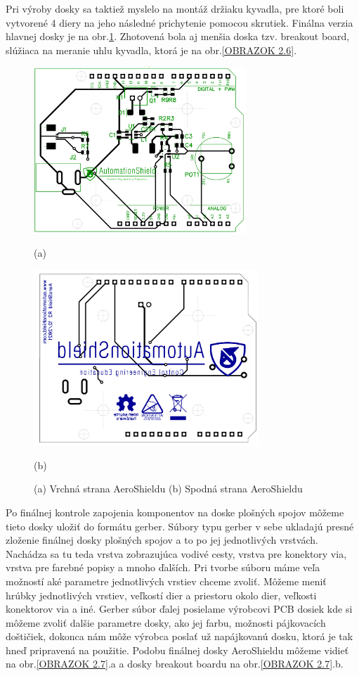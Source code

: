 Pri výroby dosky sa taktiež myslelo na montáž držiaku kyvadla, pre ktoré boli vytvorené 4 diery na jeho následné prichytenie pomocou skrutiek. Finálna verzia hlavnej dosky je na obr.\ref{OBRAZOK 2.4}. Zhotovená bola aj menšia doska tzv. breakout board, slúžiaca na meranie uhlu kyvadla, ktorá je na obr.\ref{OBRAZOK 2.6}.



\begin{figure}
\centering
\includegraphics[width=8cm]{obr/AeroShieldTOP.png}

(a)

\includegraphics[width=8.5cm]{obr/AeroShieldBOTTOM.png}

(b)

\caption{(a) Vrchná strana AeroShieldu (b) Spodná strana AeroShieldu}
\label{OBRAZOK 2.4}
\end{figure}



Po finálnej kontrole zapojenia komponentov na doske plošných spojov môžeme tieto dosky uložiť do formátu gerber. Súbory typu gerber v sebe ukladajú presné zloženie finálnej dosky plošných spojov a to po jej jednotlivých vrstvách. Nachádza sa tu teda vrstva zobrazujúca vodivé cesty, vrstva pre konektory via, vrstva pre farebné popisy a mnoho ďalších. Pri tvorbe súboru máme veľa možností aké parametre jednotlivých vrstiev chceme zvoliť. Môžeme meniť hrúbky jednotlivých vrstiev, veľkostí dier a priestoru okolo dier, veľkosti konektorov via a iné. Gerber súbor ďalej posielame výrobcovi PCB dosiek kde si môžeme zvoliť dalšie parametre dosky, ako jej farbu, možnosti pájkovacích doštičiek, dokonca nám môže výrobca poslať už napájkovanú dosku, ktorá je tak hneď pripravená na použitie. Podobu finálnej dosky AeroShieldu môžeme vidieť na obr.\ref{OBRAZOK 2.7}.a a dosky breakout boardu na obr.\ref{OBRAZOK 2.7}.b.


